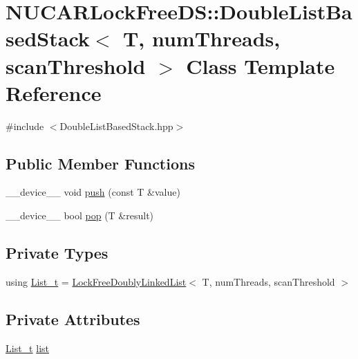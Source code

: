 \hypertarget{class_n_u_c_a_r_lock_free_d_s_1_1_double_list_based_stack}{}\section{N\+U\+C\+A\+R\+Lock\+Free\+DS\+:\+:Double\+List\+Based\+Stack$<$ T, num\+Threads, scan\+Threshold $>$ Class Template Reference}
\label{class_n_u_c_a_r_lock_free_d_s_1_1_double_list_based_stack}


{\ttfamily \#include $<$Double\+List\+Based\+Stack.\+hpp$>$}

\subsection*{Public Member Functions}
\begin{DoxyCompactItemize}
\item 
\+\_\+\+\_\+device\+\_\+\+\_\+ void \mbox{\hyperlink{class_n_u_c_a_r_lock_free_d_s_1_1_double_list_based_stack_aa7be3345eca6fad8f568c3a1b9bf1fd6}{push}} (const T \&value)
\item 
\+\_\+\+\_\+device\+\_\+\+\_\+ bool \mbox{\hyperlink{class_n_u_c_a_r_lock_free_d_s_1_1_double_list_based_stack_a5ff2af6c3939738c9a225107242467c9}{pop}} (T \&result)
\end{DoxyCompactItemize}
\subsection*{Private Types}
\begin{DoxyCompactItemize}
\item 
using \mbox{\hyperlink{class_n_u_c_a_r_lock_free_d_s_1_1_double_list_based_stack_a1ef386e8aaa2b4bb17d44df51f0c9f76}{List\+\_\+t}} = \mbox{\hyperlink{class_n_u_c_a_r_lock_free_d_s_1_1_lock_free_doubly_linked_list}{Lock\+Free\+Doubly\+Linked\+List}}$<$ T, num\+Threads, scan\+Threshold $>$
\end{DoxyCompactItemize}
\subsection*{Private Attributes}
\begin{DoxyCompactItemize}
\item 
\mbox{\hyperlink{class_n_u_c_a_r_lock_free_d_s_1_1_double_list_based_stack_a1ef386e8aaa2b4bb17d44df51f0c9f76}{List\+\_\+t}} \mbox{\hyperlink{class_n_u_c_a_r_lock_free_d_s_1_1_double_list_based_stack_abc2cb5a9e08f892c83fd811506eddc05}{list}}
\end{DoxyCompactItemize}


